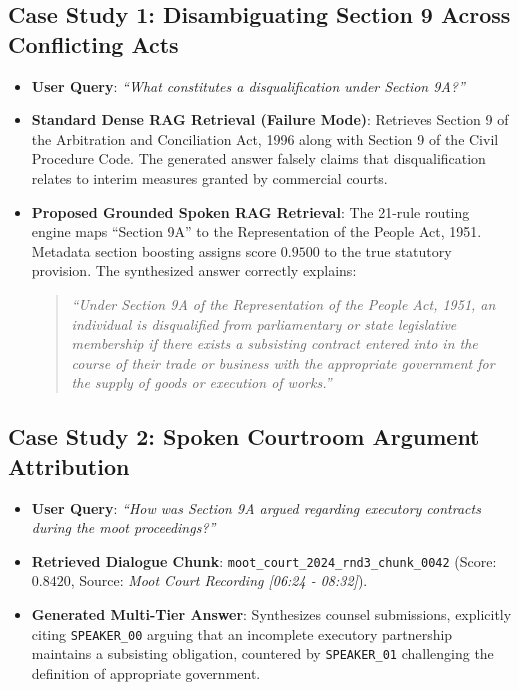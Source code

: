 \documentclass{llncs}
\begin{document}
\subsection{Case Study 1: Disambiguating Section 9 Across Conflicting Acts}
\begin{itemize}
    \item \textbf{User Query}: \textit{``What constitutes a disqualification under Section 9A?''}
    \item \textbf{Standard Dense RAG Retrieval (Failure Mode)}: Retrieves Section 9 of the Arbitration and Conciliation Act, 1996 along with Section 9 of the Civil Procedure Code. The generated answer falsely claims that disqualification relates to interim measures granted by commercial courts.
    \item \textbf{Proposed Grounded Spoken RAG Retrieval}: The 21-rule routing engine maps ``Section 9A'' to the Representation of the People Act, 1951. Metadata section boosting assigns score $0.9500$ to the true statutory provision. The synthesized answer correctly explains:
    \begin{quote}
    \small
    \textit{``Under Section 9A of the Representation of the People Act, 1951, an individual is disqualified from parliamentary or state legislative membership if there exists a subsisting contract entered into in the course of their trade or business with the appropriate government for the supply of goods or execution of works.''}
    \end{quote}
\end{itemize}

\subsection{Case Study 2: Spoken Courtroom Argument Attribution}
\begin{itemize}
    \item \textbf{User Query}: \textit{``How was Section 9A argued regarding executory contracts during the moot proceedings?''}
    \item \textbf{Retrieved Dialogue Chunk}: \texttt{moot\_court\_2024\_rnd3\_chunk\_0042} (Score: $0.8420$, Source: \textit{Moot Court Recording [06:24 - 08:32]}).
    \item \textbf{Generated Multi-Tier Answer}: Synthesizes counsel submissions, explicitly citing \texttt{SPEAKER\_00} arguing that an incomplete executory partnership maintains a subsisting obligation, countered by \texttt{SPEAKER\_01} challenging the definition of appropriate government.
\end{itemize}
\end{document}

